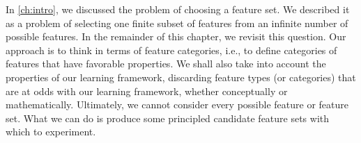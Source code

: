 

In \ref{ch:intro}, we discussed the problem of choosing a feature set. 
We described it as a problem of selecting one finite subset of 
features from an infinite number of possible features.
In the remainder of this chapter, we revisit this question. Our approach is to think in terms of feature categories, i.e., to define categories of features that have favorable properties. We shall also take into account the properties of our learning framework, discarding feature types (or categories) that are at odds with our learning framework, whether conceptually or mathematically. Ultimately, we cannot consider every possible feature or feature set. What we can do is produce some principled candidate feature sets with which to experiment. 

